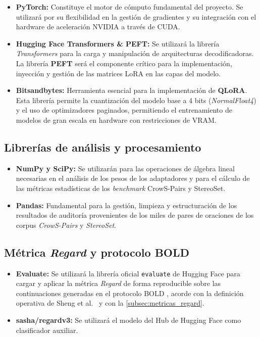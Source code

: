 \documentclass[12pt,a4paper]{report}
\begin{document}
\begin{itemize}
    \item \textbf{PyTorch:} Constituye el motor de cómputo fundamental del proyecto. Se utilizará por su flexibilidad en la gestión de gradientes y su integración con el hardware de aceleración NVIDIA a través de CUDA.
    
    \item \textbf{Hugging Face Transformers \& PEFT:} Se utilizará la librería \textit{Transformers} para la carga y manipulación de arquitecturas decodificadoras. La librería \textbf{PEFT} será el componente crítico para la implementación, inyección y gestión de las matrices LoRA en las capas del modelo.
    
    \item \textbf{Bitsandbytes:} Herramienta esencial para la implementación de \textbf{QLoRA}. Esta librería permite la cuantización del modelo base a 4 bits (\textit{NormalFloat4}) y el uso de optimizadores paginados, permitiendo el entrenamiento de modelos de gran escala en hardware con restricciones de VRAM.
\end{itemize}

\subsection{Librerías de análisis y procesamiento}
\label{subsec:librerias}

\begin{itemize}
    \item \textbf{NumPy y SciPy:} Se utilizarán para las operaciones de álgebra lineal necesarias en el análisis de los pesos de los adaptadores y para el cálculo de las métricas 
    estadísticas de los \textit{benchmark} CrowS-Pairs y StereoSet.
    
    \item \textbf{Pandas:} Fundamental para la gestión, limpieza y estructuración de los resultados de auditoría provenientes de los miles de pares de oraciones de los corpus \textit{CrowS-Pairs} y \textit{StereoSet}.
\end{itemize}

\subsection{Métrica \textit{Regard} y protocolo BOLD}
\label{subsec:herramientas_regard}

\begin{itemize}
    \item \textbf{Evaluate:} Se utilizará la librería oficial \texttt{evaluate} de Hugging Face para cargar y aplicar la métrica \textit{Regard} de forma reproducible sobre las continuaciones generadas en el protocolo BOLD \cite{dhamala_bold_2021}, acorde con la definición operativa de Sheng et al.\ \cite{sheng_woman_2019} y con la \autoref{subsec:metricas_regard}.
    
    \item \textbf{sasha/regardv3:} Se utilizará el modelo  del Hub de Hugging Face como 
    clasificador auxiliar.
\end{itemize}
\end{document}
